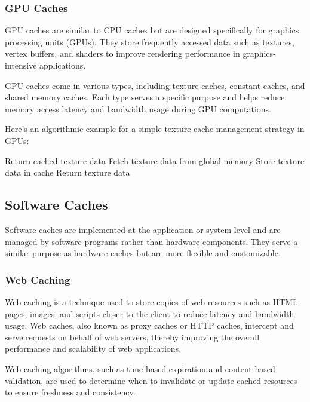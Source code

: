 \documentclass[12pt]{book} %
\begin{document}
\subsubsection{GPU Caches}

GPU caches are similar to CPU caches but are designed specifically for graphics processing units (GPUs). They store frequently accessed data such as textures, vertex buffers, and shaders to improve rendering performance in graphics-intensive applications.

GPU caches come in various types, including texture caches, constant caches, and shared memory caches. Each type serves a specific purpose and helps reduce memory access latency and bandwidth usage during GPU computations.

Here's an algorithmic example for a simple texture cache management strategy in GPUs:
\FloatBarrier
\begin{algorithm}[H]
\caption{Texture Cache Management in GPUs}
\begin{algorithmic}[1]
    \State Return cached texture data
\Else
    \State Fetch texture data from global memory
    \State Store texture data in cache
    \State Return texture data
\EndIf
\EndFunction
\end{algorithmic}
\end{algorithm}

\subsection{Software Caches}

Software caches are implemented at the application or system level and are managed by software programs rather than hardware components. They serve a similar purpose as hardware caches but are more flexible and customizable.

\subsubsection{Web Caching}

Web caching is a technique used to store copies of web resources such as HTML pages, images, and scripts closer to the client to reduce latency and bandwidth usage. Web caches, also known as proxy caches or HTTP caches, intercept and serve requests on behalf of web servers, thereby improving the overall performance and scalability of web applications.

Web caching algorithms, such as time-based expiration and content-based validation, are used to determine when to invalidate or update cached resources to ensure freshness and consistency.
\end{document}
